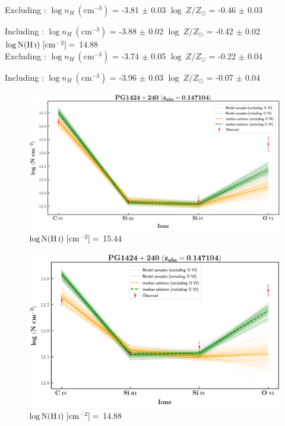   Excluding  : $\log n_H \ (\text{cm}^{-3})$ = -3.81 $\pm$ 0.03 \hspace{10mm} $\log \ Z/Z_\odot$ = -0.46 $\pm$ 0.03
  
  Including  : $\log n_H \ (\text{cm}^{-3})$ = -3.88 $\pm$ 0.02 \hspace{10mm} $\log \ Z/Z_\odot$ = -0.42 $\pm$ 0.02 \\
  
  $\log \text{N}(\ion{H}{i}) \ [\text{cm}^{-2}]=$ 14.88 \\
  
  Excluding  : $\log n_H \ (\text{cm}^{-3})$ = -3.74 $\pm$ 0.05 \hspace{10mm} $\log \ Z/Z_\odot$ = -0.22 $\pm$ 0.04
  
  Including  : $\log n_H \ (\text{cm}^{-3})$ = -3.96 $\pm$ 0.03 \hspace{10mm} $\log \ Z/Z_\odot$ = -0.07 $\pm$ 0.04
  
  \newpage
  
  \begin{figure}[!h]
    \centering
      \includegraphics[width=0.9\linewidth]{Ionisation-Modelling-Plots/pg1424-z=0.147104-compIII.png}
      \caption{$\log \text{N}(\ion{H}{i}) \ [\text{cm}^{-2}]=$ 15.44}
  \end{figure}
  
  \begin{figure}[!b]
    \centering
      \includegraphics[width=0.9\linewidth]{Ionisation-Modelling-Plots/pg1424-z=0.147104-compII.png}
      \caption{$\log \text{N}(\ion{H}{i}) \ [\text{cm}^{-2}]=$ 14.88}
  \end{figure}
  

